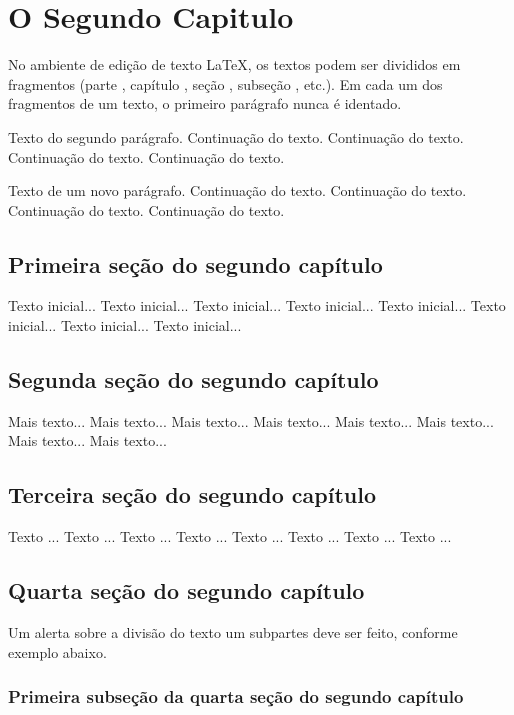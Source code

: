 \chapter{O Segundo Capitulo}
No ambiente de edição de texto \LaTeX, 
os textos podem ser divididos em fragmentos
(parte , capítulo , 
seção , subseção , etc.).
Em cada um dos fragmentos de um texto,
o primeiro parágrafo  nunca é identado.


Texto do segundo parágrafo.
Continuação do texto.
Continuação do texto.
Continuação do texto.
Continuação do texto.

Texto de um novo parágrafo.
Continuação do texto.
Continuação do texto.
Continuação do texto.
Continuação do texto.


\section{Primeira seção do segundo capítulo}

Texto inicial...
Texto inicial...
Texto inicial...
Texto inicial...
Texto inicial...
Texto inicial...
Texto inicial...
Texto inicial...

\section{Segunda seção do segundo capítulo}

Mais texto... Mais texto...
Mais texto... Mais texto...
Mais texto... Mais texto...
Mais texto... Mais texto...

\section{Terceira seção do segundo capítulo}

Texto ... Texto ...
Texto ... Texto ...
Texto ... Texto ...
Texto ... Texto ...

\section{Quarta seção do segundo capítulo}

Um alerta sobre a divisão do texto um subpartes 
deve ser feito, conforme exemplo abaixo. 

\subsection{Primeira subseção da quarta seção do segundo capítulo}

